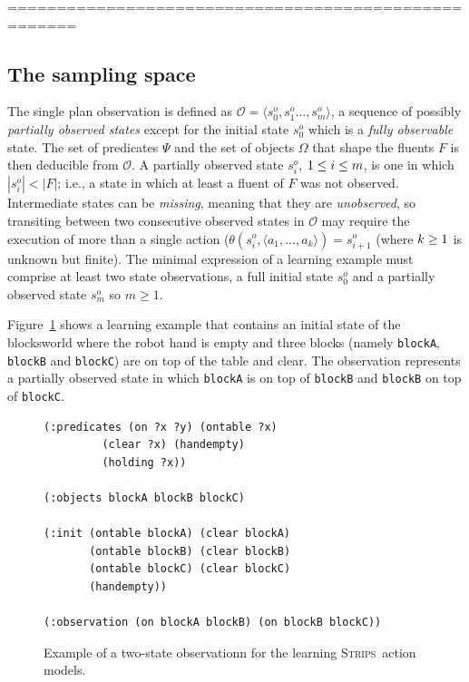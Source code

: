 \documentclass{article}
\newcommand{\tup}[1]{{\langle #1 \rangle}}
\newcommand{\strips}{\textsc{Strips}}
\begin{document}
=====================================================

\subsection{The sampling space}

The single plan observation is defined as $\mathcal{O}=\tup{s_0^o,s_1^o \ldots, s_m^o}$, a sequence of possibly {\em partially observed states} except for the initial state $s_0^o$ which is a {\em fully observable} state. The set of predicates $\Psi$ and the set of objects $\Omega$ that shape the fluents $F$ is then deducible from $\mathcal{O}$. A partially observed state $s_i^o$, ${\small 1\leq i\leq m}$, is one in which $|s_i^o| < |F|$; i.e., a state in which at least a fluent of $F$ was not observed. Intermediate states can be {\em missing}, meaning that they are {\em unobserved}, so transiting between two consecutive observed states in $\mathcal{O}$ may require the execution of more than a single action ($\theta(s_i^o,\tup{a_1,\ldots,a_k})=s_{i+1}^o$ (where ${\small k\geq 1}$ is unknown but finite). The minimal expression of a learning example must comprise at least two state observations, a full initial state $s_0^o$ and a partially observed state $s_m^o$ so $m \geq 1$.

Figure~\ref{fig:observation} shows a learning example that contains an initial state of the blocksworld where the robot hand is empty and three blocks (namely {\small\tt blockA}, {\small\tt blockB} and {\small\tt blockC}) are on top of the table and clear. The observation represents a partially observed state in which {\tt\small{blockA}} is on top of {\tt\small{blockB}} and {\tt\small{blockB}} on top of {\tt\small{blockC}}.

\begin{figure}[hbt!]
  \begin{tiny}
  \begin{verbatim}
(:predicates (on ?x ?y) (ontable ?x)
	     (clear ?x) (handempty)
	     (holding ?x))

(:objects blockA blockB blockC)

(:init (ontable blockA) (clear blockA)
       (ontable blockB) (clear blockB)
       (ontable blockC) (clear blockC)
       (handempty))

(:observation (on blockA blockB) (on blockB blockC))
  \end{verbatim}
  \end{tiny}
	\caption{\small Example of a two-state observationn for the learning \strips\ action models.}
	\label{fig:observation}
\end{figure}
\end{document}
